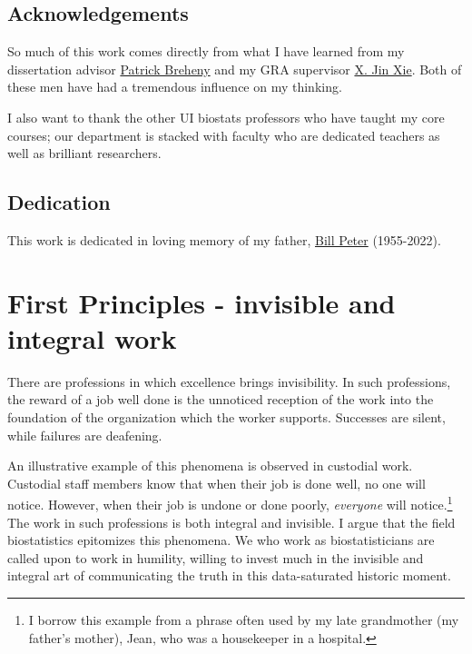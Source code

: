 \documentclass[
]{book}
\begin{document}
\hypertarget{acknowledgements}{%
\section{Acknowledgements}\label{acknowledgements}}

So much of this work comes directly from what I have learned from my dissertation advisor \href{https://myweb.uiowa.edu/pbreheny/}{Patrick Breheny} and my GRA supervisor \href{https://scholar.google.com/citations?hl=en\&user=flqLOJIAAAAJ}{X. Jin Xie}. Both of these men have had a tremendous influence on my thinking.

I also want to thank the other UI biostats professors who have taught my core courses; our department is stacked with faculty who are dedicated teachers as well as brilliant researchers.

\hypertarget{dedication}{%
\section{Dedication}\label{dedication}}

This work is dedicated in loving memory of my father, \href{https://www.hendersonvillefh.com/obituary/William-Peter}{Bill Peter} (1955-2022).

\hypertarget{first-principles---invisible-and-integral-work}{%
\chapter{First Principles - invisible and integral work}\label{first-principles---invisible-and-integral-work}}

There are professions in which excellence brings invisibility. In such professions, the reward of a job well done is the unnoticed reception of the work into the foundation of the organization which the worker supports. Successes are silent, while failures are deafening.

An illustrative example of this phenomena is observed in custodial work. Custodial staff members know that when their job is done well, no one will notice. However, when their job is undone or done poorly, \emph{everyone} will notice.\footnote{I borrow this example from a phrase often used by my late grandmother (my father's mother), Jean, who was a housekeeper in a hospital.} The work in such professions is both integral and invisible. I argue that the field biostatistics epitomizes this phenomena. We who work as biostatisticians are called upon to work in humility, willing to invest much in the invisible and integral art of communicating the truth in this data-saturated historic moment.
\end{document}
